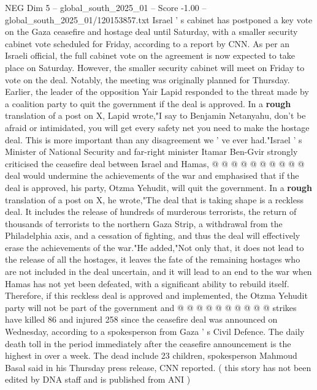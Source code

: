 \begin{textsample}{NEG Dim 5 – global\_south\_2025\_01 – Score -1.00 – global\_south\_2025\_01/120153857.txt}  \label{ex:f5_neg_106}
Israel ' s cabinet has postponed a key vote on the Gaza ceasefire and hostage deal until Saturday, with a smaller security cabinet vote scheduled for Friday, according to a report by CNN.
As per an Israeli official, the full cabinet vote on the agreement is now expected to take place on Saturday.
However, the smaller security cabinet will meet on Friday to vote on the deal.
Notably, the meeting was originally planned for Thursday.
Earlier, the leader of the opposition Yair Lapid responded to the threat made by a coalition party to quit the government if the deal is approved.
In a \textbf{rough} translation of a post on X, Lapid wrote,"I say to Benjamin Netanyahu, don't be afraid or intimidated, you will get every safety net you need to make the hostage deal.
This is more important than any disagreement we ' ve ever had."Israel ' s Minister of National Security and far-right minister Itamar Ben-Gvir strongly criticised the ceasefire deal between Israel and Hamas, @ @ @ @ @ @ @ @ @ @ deal would undermine the achievements of the war and emphasised that if the deal is approved, his party, Otzma Yehudit, will quit the government.
In a \textbf{rough} translation of a post on X, he wrote,"The deal that is taking shape is a reckless deal.
It includes the release of hundreds of murderous terrorists, the return of thousands of terrorists to the northern Gaza Strip, a withdrawal from the Philadelphia axis, and a cessation of fighting, and thus the deal will effectively erase the achievements of the war."He added,"Not only that, it does not lead to the release of all the hostages, it leaves the fate of the remaining hostages who are not included in the deal uncertain, and it will lead to an end to the war when Hamas has not yet been defeated, with a significant ability to rebuild itself.
Therefore, if this reckless deal is approved and implemented, the Otzma Yehudit party will not be part of the government and @ @ @ @ @ @ @ @ @ @ strikes have killed 86 and injured 258 since the ceasefire deal was announced on Wednesday, according to a spokesperson from Gaza ' s Civil Defence.
The daily death toll in the period immediately after the ceasefire announcement is the highest in over a week.
The dead include 23 children, spokesperson Mahmoud Basal said in his Thursday press release, CNN reported. ( this story has not been edited by DNA staff and is published from ANI )

\end{textsample}
